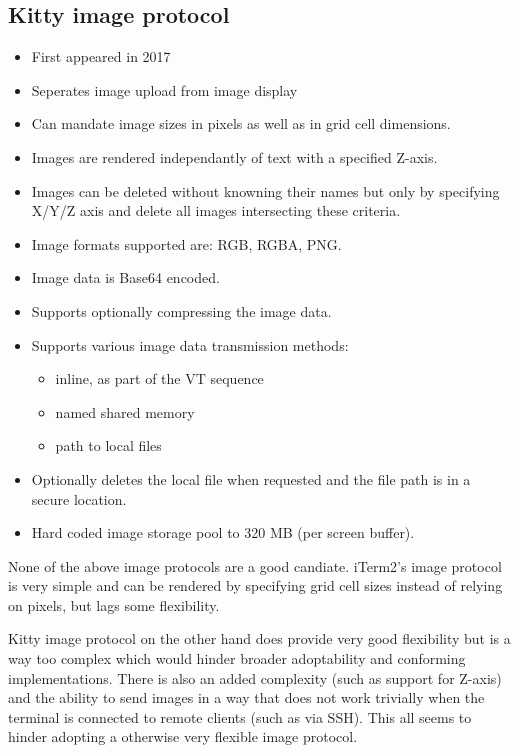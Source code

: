 \documentclass{article}
\begin{document}
\subsection{Kitty image protocol}

\begin{itemize}
    \item First appeared in 2017
    \item Seperates image upload from image display
    \item Can mandate image sizes in pixels as well as in grid cell dimensions.
    \item Images are rendered independantly of text with a specified Z-axis.
    \item Images can be deleted without knowning their names but only by specifying X/Y/Z axis
          and delete all images intersecting these criteria.
    \item Image formats supported are: RGB, RGBA, PNG.
    \item Image data is Base64 encoded.
    \item Supports optionally compressing the image data.
    \item Supports various image data transmission methods:
        \begin{itemize}
            \item inline, as part of the VT sequence
            \item named shared memory
            \item path to local files
        \end{itemize}
    \item Optionally deletes the local file when requested and the file path is in a secure location.
    \item Hard coded image storage pool to 320 MB (per screen buffer).
\end{itemize}

None of the above image protocols are a good candiate. iTerm2's image protocol is very simple and
can be rendered by specifying grid cell sizes instead of relying on pixels, but lags some
flexibility.

Kitty image protocol on the other hand does provide very good flexibility but is a way too complex which
would hinder broader adoptability and conforming implementations. There is also an added complexity
(such as support for Z-axis) and the ability to send images in a way that does not work trivially
when the terminal is connected to remote clients (such as via SSH). This all seems to hinder
adopting a otherwise very flexible image protocol.
\end{document}
